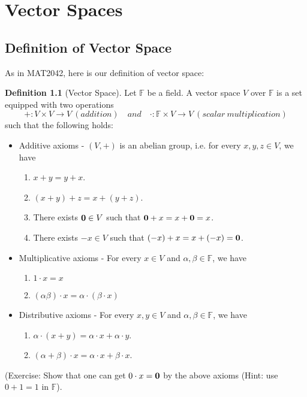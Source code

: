 \documentclass[11pt,openany]{book}
\theoremstyle{plain}
\theoremstyle{definition}
\newtheorem{definition}[definition]{Definition}
\theoremstyle{remark}
\begin{document}
\chapter{Vector Spaces}
\section{Definition of Vector Space}
As in MAT2042, here is our definition of vector space:
\begin{definition}[Vector Space]
Let $\mathbb{F}$ be a field. A vector space $V$ over $\mathbb{F}$ is a set equipped with two operations
$$+: V \times V \to V\ (addition) \quad and \quad  \cdot: \mathbb{F} \times V \to V\ (scalar\ multiplication)$$
such that the following holds:
\begin{itemize}
    \item Additive axioms - $(V,+)$ is an abelian group, i.e. for every $x,y,z \in V$, we have
        \begin{enumerate}
            \item $x+y = y+x$.
            \item $(x+y)+z = x+(y+z)$.
            \item There exists ${\bf 0} \in V$ such that ${\bf 0}+x = x+{\bf 0} = x$.
            \item There exists $-x \in V$ such that $(-x) + x = x + (-x) = {\bf 0}$.
        \end{enumerate}
    \item Multiplicative axioms - For every $x \in V$ and $\alpha, \beta \in \mathbb{F}$, we have
        \begin{enumerate}
            \item $1\cdot x = x$
            \item $(\alpha\beta)\cdot x = \alpha \cdot (\beta \cdot x)$
        \end{enumerate}
        \item Distributive axioms - For every $x,y \in V$ and $\alpha, \beta \in \mathbb{F}$, we have
        \begin{enumerate}
            \item $\alpha\cdot (x+y) = \alpha\cdot x + \alpha\cdot y$.
            \item $(\alpha+\beta)\cdot x = \alpha\cdot x + \beta\cdot x$.    
        \end{enumerate}
\end{itemize}  
(Exercise: Show that one can get $0 \cdot x = {\bf 0}$ by the above axioms (Hint: use $0+1 = 1$ in $\mathbb{F}$).

\end{definition}
\end{document}
